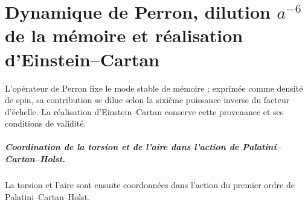 \chapter{Dynamique de Perron, dilution \texorpdfstring{\(a^{-6}\)}{a⁻⁶} de la mémoire et réalisation d’Einstein–Cartan}
\label{chap:parte-iv-67}

L’opérateur de Perron fixe le mode stable de mémoire ; exprimée comme densité de spin, sa contribution se dilue selon la sixième puissance inverse du facteur d’échelle. La réalisation d’Einstein--Cartan conserve cette provenance et ses conditions de validité.



\paragraph{Coordination de la torsion et de l’aire dans l’action de Palatini--Cartan--Holst.} La torsion et l’aire sont ensuite coordonnées dans l’action du premier ordre de Palatini--Cartan--Holst.
